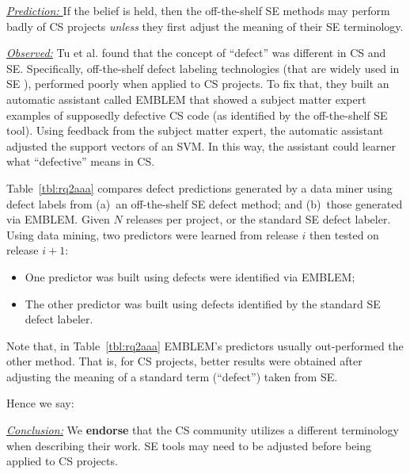 \documentclass[sigconf,review,anonymous]{acmart}
\newcommand{\bi}{\begin{itemize}}
\newcommand{\ei}{\end{itemize}}
\newenvironment{RQ}{\vspace{1mm}\begin{tcolorbox}[enhanced,width=3.4in,size=fbox,colback=red!5!white,drop shadow southeast,sharp corners]}{\end{tcolorbox}}
\begin{document}
\noindent \textit{\underline{Prediction: }} If the belief is held, then the off-the-shelf SE methods may perform badly of CS projects {\em unless} they first adjust the meaning of their SE terminology.

\noindent \textit{\underline{Observed:}} Tu et al. \cite{tu2019better} found that the concept of ``defect'' was  different in CS and SE.
Specifically, off-the-shelf defect labeling technologies (that are widely used  in SE \cite{tu2019better,mockus00changeskeys}),
performed poorly when applied to CS projects.
To fix that, they built an automatic assistant called EMBLEM that showed a subject matter expert 
examples of supposedly defective CS code (as identified by the off-the-shelf SE tool).
Using feedback from the subject matter expert, the automatic assistant adjusted the support vectors of an SVM. In this way, the assistant could learner what ``defective'' means in CS.

Table~\ref{tbl:rq2aaa} 
compares defect predictions generated by a data
miner using defect labels from (a)~an  off-the-shelf SE defect method;
and (b)~those generated via EMBLEM. 
Given $N$ releases per project, or the standard SE defect labeler.
Using data mining, two predictors were learned from release $i$ then tested on release $i+1$:
\bi
\item
One predictor was built using defects were identified  via EMBLEM;
\item
The other predictor was built using defects identified by the standard SE defect labeler.
\ei


Note that, in Table~\ref{tbl:rq2aaa}  EMBLEM's predictors usually out-performed the other method.
That is, for CS projects,
better results were obtained after adjusting the meaning of a standard term (``defect'')
taken from SE.


Hence we say:

\begin{RQ}
\textit{\underline{Conclusion:}} We \textbf{endorse} that the CS community utilizes a different terminology when describing their work. SE tools
may need to be adjusted before being applied to CS projects.
\end{RQ}
\end{document}
